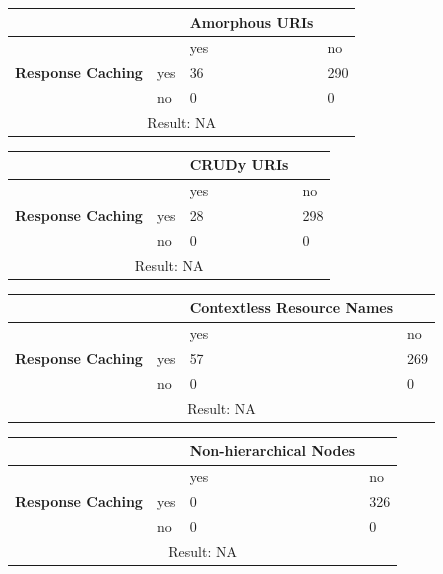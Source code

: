 \documentclass[a4paper,12pt]{article}
\begin{document}
\begin{center}
  \begin{tabular}{| p{60mm} | p{10mm} | p{35mm} | p{35mm} |}
  \hline
   & & \textbf{Amorphous URIs} &
  \\
  \hline
  & & yes & no
  \\
  \hline
  \textbf{Response Caching} & yes & 36 & 290
  \\
  \hline
   & no & 0 & 0
  \\
  \hline
  \multicolumn{4}{|c|}{Result: NA}
  \\ \hline
  \end{tabular}
  \end{center}

\begin{center}
  \begin{tabular}{| p{60mm} | p{10mm} | p{35mm} | p{35mm} |}
  \hline
   & & \textbf{CRUDy URIs} &
  \\
  \hline
  & & yes & no
  \\
  \hline
  \textbf{Response Caching} & yes & 28 & 298
  \\
  \hline
   & no & 0 & 0
  \\
  \hline
  \multicolumn{4}{|c|}{Result: NA}
  \\ \hline
  \end{tabular}
  \end{center}

\begin{center}
  \begin{tabular}{| p{60mm} | p{10mm} | p{35mm} | p{35mm} |}
  \hline
   & & \textbf{Contextless Resource Names} &
  \\
  \hline
  & & yes & no
  \\
  \hline
  \textbf{Response Caching} & yes & 57 & 269
  \\
  \hline
   & no & 0 & 0
  \\
  \hline
  \multicolumn{4}{|c|}{Result: NA}
  \\ \hline
  \end{tabular}
  \end{center}

\begin{center}
  \begin{tabular}{| p{60mm} | p{10mm} | p{35mm} | p{35mm} |}
  \hline
   & & \textbf{Non-hierarchical Nodes} &
  \\
  \hline
  & & yes & no
  \\
  \hline
  \textbf{Response Caching} & yes & 0 & 326
  \\
  \hline
   & no & 0 & 0
  \\
  \hline
  \multicolumn{4}{|c|}{Result: NA}
  \\ \hline
  \end{tabular}
  \end{center}
\end{document}
